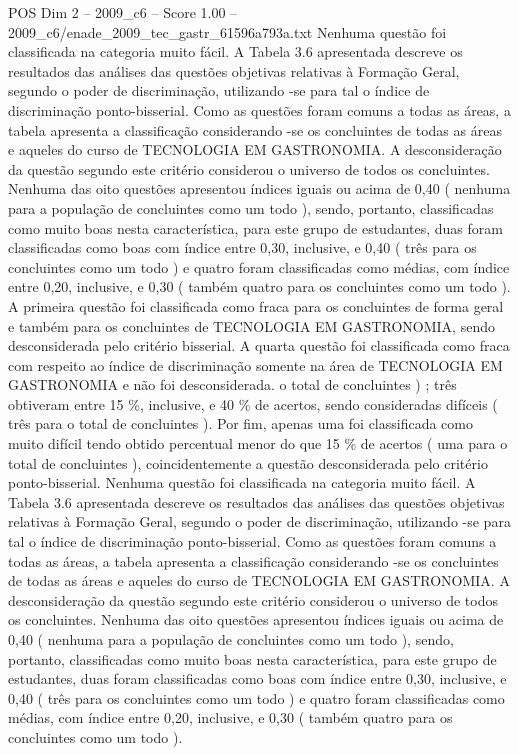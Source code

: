 \begin{textsample}{POS Dim 2 – 2009\_c6 – Score 1.00 – 2009\_c6/enade\_2009\_tec\_gastr\_61596a793a.txt}
Nenhuma questão foi classificada na categoria muito fácil.
A Tabela 3.6 apresentada descreve os resultados das análises das questões objetivas relativas à Formação Geral, segundo o poder de discriminação, utilizando -se para tal o índice de discriminação ponto-bisserial.
Como as questões foram comuns a todas as áreas, a tabela apresenta a classificação considerando -se os concluintes de todas as áreas e aqueles do curso de TECNOLOGIA EM GASTRONOMIA.
A desconsideração da questão segundo este critério considerou o universo de todos os concluintes.
Nenhuma das oito questões apresentou índices iguais ou acima de 0,40 ( nenhuma para a população de concluintes como um todo ), sendo, portanto, classificadas como muito boas nesta característica, para este grupo de estudantes, duas foram classificadas como boas com índice entre 0,30, inclusive, e 0,40 ( três para os concluintes como um todo ) e quatro foram classificadas como médias, com índice entre 0,20, inclusive, e 0,30 ( também quatro para os concluintes como um todo ).
A primeira questão foi classificada como fraca para os concluintes de forma geral e também para os concluintes de TECNOLOGIA EM GASTRONOMIA, sendo desconsiderada pelo critério bisserial.
A quarta questão foi classificada como fraca com respeito ao índice de discriminação somente na área de TECNOLOGIA EM GASTRONOMIA e não foi desconsiderada. o total de concluintes ) ; três obtiveram entre 15 \%, inclusive, e 40 \% de acertos, sendo consideradas difíceis ( três para o total de concluintes ).
Por fim, apenas uma foi classificada como muito difícil tendo obtido percentual menor do que 15 \% de acertos ( uma para o total de concluintes ), coincidentemente a questão desconsiderada pelo critério ponto-bisserial.
Nenhuma questão foi classificada na categoria muito fácil.
A Tabela 3.6 apresentada descreve os resultados das análises das questões objetivas relativas à Formação Geral, segundo o poder de discriminação, utilizando -se para tal o índice de discriminação ponto-bisserial.
Como as questões foram comuns a todas as áreas, a tabela apresenta a classificação considerando -se os concluintes de todas as áreas e aqueles do curso de TECNOLOGIA EM GASTRONOMIA.
A desconsideração da questão segundo este critério considerou o universo de todos os concluintes.
Nenhuma das oito questões apresentou índices iguais ou acima de 0,40 ( nenhuma para a população de concluintes como um todo ), sendo, portanto, classificadas como muito boas nesta característica, para este grupo de estudantes, duas foram classificadas como boas com índice entre 0,30, inclusive, e 0,40 ( três para os concluintes como um todo ) e quatro foram classificadas como médias, com índice entre 0,20, inclusive, e 0,30 ( também quatro para os concluintes como um todo ).

\end{textsample}
